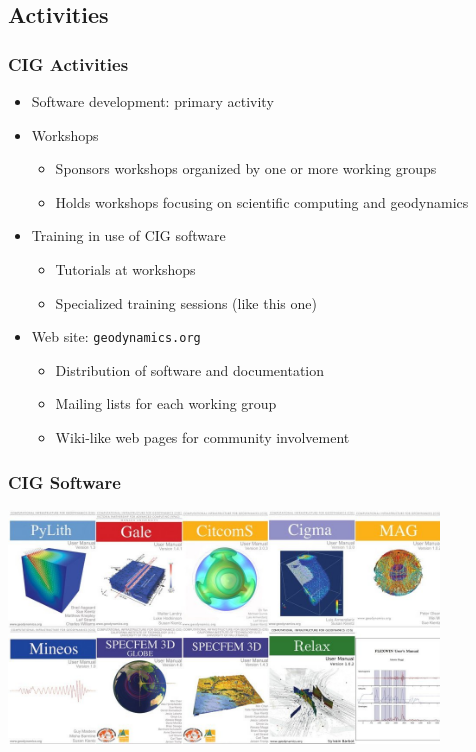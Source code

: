 \documentclass{beamer}
\begin{document}
\subsection{Activities}

\begin{frame}
  \frametitle{CIG Activities}
  \summary{}

  \begin{itemize}
  \item Software development: primary activity
  \item Workshops
    \begin{itemize}
    \item Sponsors workshops organized by one or more working groups
    \item Holds workshops focusing on scientific computing and geodynamics
    \end{itemize}
  \item Training in use of CIG software
    \begin{itemize}
    \item Tutorials at workshops
    \item Specialized training sessions (like this one)
    \end{itemize}
  \item Web site: {\tt geodynamics.org}
    \begin{itemize}
    \item Distribution of software and documentation
    \item Mailing lists for each working group
    \item Wiki-like web pages for community involvement
    \end{itemize}
  \end{itemize}
 
\end{frame}


\begin{frame}
  \frametitle{CIG Software}
  \summary{}

  \vfill
  \begin{center}
    \includegraphics[width=4.5in]{figs/covers}
  \end{center}
  \vfill

\end{frame}

\end{document}
